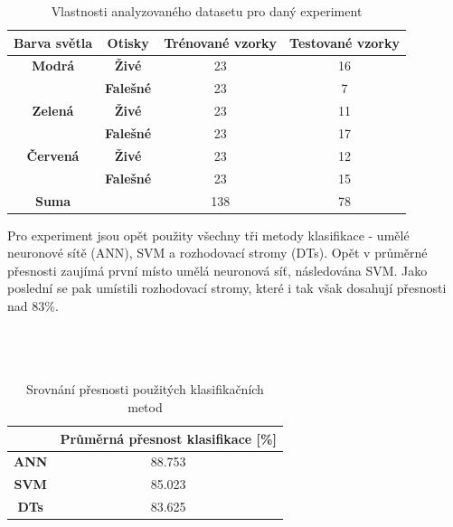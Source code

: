 \capstartfalse
\begin{table}[!htbp]
\centering
\begin{tabular}{|c|c|c|c|}
\hline
\textbf{Barva světla} & \textbf{Otisky}  & \textbf{Trénované vzorky} & \textbf{Testované vzorky} \\ \hline
\textbf{Modrá}        & \textbf{Živé}    & 23                        & 16                        \\ \hline
\textbf{}             & \textbf{Falešné} & 23                        & 7                         \\ \hline
\textbf{Zelená}       & \textbf{Živé}    & 23                        & 11                        \\ \hline
\textbf{}             & \textbf{Falešné} & 23                        & 17                        \\ \hline
\textbf{Červená}      & \textbf{Živé}    & 23                        & 12                        \\ \hline
\textbf{}             & \textbf{Falešné} & 23                        & 15                        \\ \hline
\textbf{Suma}       & \textbf{}        & 138                       & 78                        \\ \hline
\end{tabular}
\caption{Vlastnosti analyzovaného datasetu pro daný experiment}
\end{table}
\capstarttrue

Pro experiment jsou opět použity všechny tři metody klasifikace - umělé neuronové sítě (ANN), SVM a rozhodovací stromy (DTs). Opět v průměrné přesnosti zaujímá první místo umělá neuronová síť, následována SVM. Jako poslední se pak umístili rozhodovací stromy, které i tak však dosahují přesnosti nad 83\%.\\\\\\\\

\capstartfalse
\begin{table}[!htbp]
\centering
\begin{tabular}{|c|c|}
\hline
                             & \textbf{Průměrná přesnost klasifikace {[}\%{]}} \\ \hline
\textbf{ANN} & 88.753                                         \\ \hline
\textbf{SVM}                 & 85.023                                         \\ \hline
\textbf{DTs}   & 83.625                                         \\ \hline
\end{tabular}
\caption{Srovnání přesnosti použitých klasifikačních metod}
\end{table}
\capstarttrue

